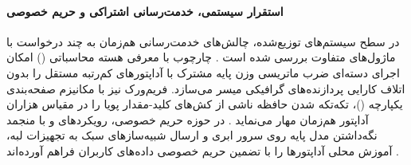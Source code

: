\paragraph*{استقرار سیستمی، خدمت‌رسانی اشتراکی و حریم خصوصی}
در سطح سیستم‌های توزیع‌شده، چالش‌های خدمت‌رسانی هم‌زمان به چند درخواست با ماژول‌های  متفاوت بررسی شده است \cite{han2024peft, zhang2025survey}. چارچوب  با معرفی هسته محاسباتی  () امکان اجرای دسته‌ای ضرب ماتریسی وزن پایه مشترک با آداپتورهای کم‌رتبه مستقل را بدون اتلاف کارایی پردازنده‌های گرافیکی میسر می‌سازد. فریم‌ورک  نیز با مکانیزم صفحه‌بندی یکپارچه ()، تکه‌تکه شدن حافظه ناشی از کش‌های کلید-مقدار پویا را در مقیاس هزاران آداپتور هم‌زمان مهار می‌نماید \cite{han2024peft}. در حوزه حریم خصوصی، رویکردهای  و  با منجمد نگه‌داشتن مدل پایه روی سرور ابری و ارسال شبیه‌سازهای سبک به تجهیزات لبه، آموزش محلی آداپتورها را با تضمین حریم خصوصی داده‌های کاربران فراهم آورده‌اند \cite{han2024peft}.